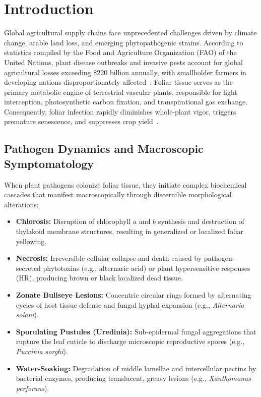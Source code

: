 \documentclass[11pt,a4paper]{article}
\begin{document}
\vspace{0.4cm}

\section{Introduction}
Global agricultural supply chains face unprecedented challenges driven by climate change, arable land loss, and emerging phytopathogenic strains. According to statistics compiled by the Food and Agriculture Organization (FAO) of the United Nations, plant disease outbreaks and invasive pests account for global agricultural losses exceeding \$220 billion annually, with smallholder farmers in developing nations disproportionately affected~\cite{fao2021crop}. Foliar tissue serves as the primary metabolic engine of terrestrial vascular plants, responsible for light interception, photosynthetic carbon fixation, and transpirational gas exchange. Consequently, foliar infection rapidly diminishes whole-plant vigor, triggers premature senescence, and suppresses crop yield~\cite{agrios2005plant}.

\subsection{Pathogen Dynamics and Macroscopic Symptomatology}
When plant pathogens colonize foliar tissue, they initiate complex biochemical cascades that manifest macroscopically through discernible morphological alterations:
\begin{itemize}
    \item \textbf{Chlorosis:} Disruption of chlorophyll $a$ and $b$ synthesis and destruction of thylakoid membrane structures, resulting in generalized or localized foliar yellowing.
    \item \textbf{Necrosis:} Irreversible cellular collapse and death caused by pathogen-secreted phytotoxins (e.g., alternaric acid) or plant hypersensitive responses (HR), producing brown or black localized dead tissue.
    \item \textbf{Zonate Bullseye Lesions:} Concentric circular rings formed by alternating cycles of host tissue defense and fungal hyphal expansion (e.g., \textit{Alternaria solani}).
    \item \textbf{Sporulating Pustules (Uredinia):} Sub-epidermal fungal aggregations that rupture the leaf cuticle to discharge microscopic reproductive spores (e.g., \textit{Puccinia sorghi}).
    \item \textbf{Water-Soaking:} Degradation of middle lamellae and intercellular pectins by bacterial enzymes, producing translucent, greasy lesions (e.g., \textit{Xanthomonas perforans}).
\end{itemize}
\end{document}
